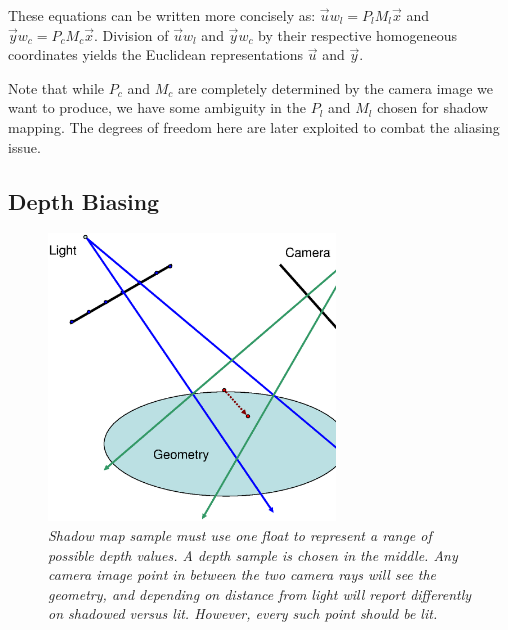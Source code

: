 \documentclass[]{article}  %
\begin{document}
These equations can be written more concisely as: $\vec{u}w_l = P_l M_l \vec{x}$ and $\vec{y} w_c = P_c M_c \vec{x}$.  Division of $\vec{u}w_l$ and $\vec{y}w_c$ by their respective homogeneous coordinates yields the Euclidean representations $\vec{u}$ and $\vec{y}$.

Note that while $P_c$ and $M_c$ are completely determined by the camera image we want to produce, we have some ambiguity in the $P_l$ and $M_l$ chosen for shadow mapping.  The degrees of freedom here are later exploited to combat the aliasing issue.  

\subsection{Depth Biasing}
\label{DepthBias}

\begin{figure}
	\centering
	  \vspace{-0.8in}
	  \hspace{-0.8in}
		\includegraphics[width=3in]{figure/depthbias.eps}
	\vspace{-1in}
	\caption{\em \small Shadow map sample must use one float to represent a range of possible depth values.  A depth sample is chosen in the middle.  Any camera image point in between the two camera rays will see the geometry, and depending on distance from light will report differently on shadowed versus lit.  However, every such point should be lit.}
	\label{fig:bias}
\end{figure}
\end{document}

